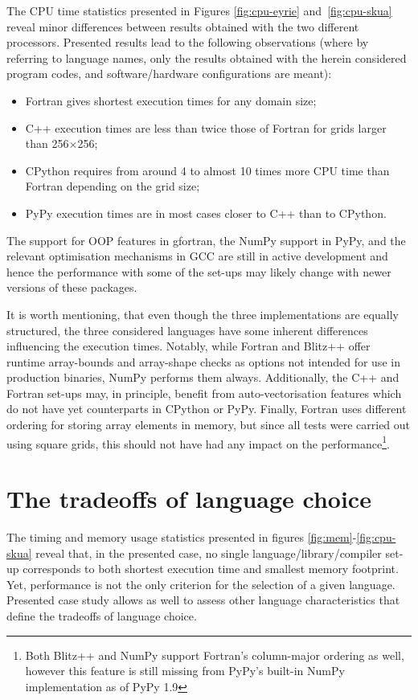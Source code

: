 \documentclass[twocolumn]{article}
\newcommand{\changed}[1]{#1}
\begin{document}
  The CPU time statistics presented in Figures \ref{fig:cpu-eyrie} and~\ref{fig:cpu-skua} reveal
    minor differences between results obtained with the two different processors.
  Presented results lead to the following observations
    (where by referring to language names, only the results obtained with the herein considered
     program codes, and software/hardware configurations are meant):
  \begin{itemize}
    \item{Fortran gives shortest execution times for any domain size;}
    \item{C++ execution times are less than twice those of Fortran for grids larger than 
      256$\times$256;}
    \item{CPython requires from around 4 to almost 10 times more CPU time than Fortran depending on the grid size;}
    \item{PyPy execution times are in most cases closer to C++ than to CPython.}
  \end{itemize}
  The support for OOP features in gfortran, the NumPy support in PyPy, and the relevant optimisation
    mechanisms in GCC are still in active development and hence the performance with some of the set-ups may 
    likely change with newer versions of these packages. 

  It is worth mentioning, that even though the three implementations are equally structured,
    the three considered languages have some inherent differences influencing the execution times.
  Notably, while Fortran and Blitz++ offer runtime array-bounds and array-shape checks as options
    not intended for use in production binaries, NumPy performs them always.
  Additionally, the C++ and Fortran set-ups may, in principle, benefit from auto-vectorisation
    features which do not have yet counterparts in CPython or PyPy.
  Finally, Fortran uses different ordering for storing array elements in memory, but since
    all tests were carried out using square grids, this should not have had any impact on the
    performance\footnote{Both Blitz++ and NumPy support Fortran's column-major ordering as well, 
    however this feature is still missing from PyPy's built-in NumPy implementation as of PyPy 1.9}.

  \section{The tradeoffs of language choice}\label{sec:tradeoffs}

  \changed{
  The timing and memory usage statistics presented in figures \ref{fig:mem}-\ref{fig:cpu-skua}
    reveal that, in the presented case, no single language/library/compiler set-up 
    corresponds to both shortest execution time and smallest memory footprint.
  Yet, performance is not the only criterion for the selection of a given language.
  Presented case study allows as well to assess other language characteristics 
    that define the tradeoffs of language choice.
  }
\end{document}
